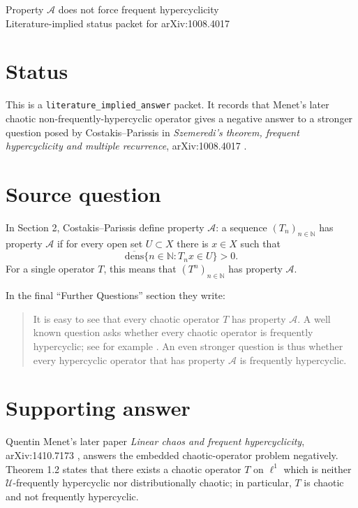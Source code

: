 \documentclass[11pt]{article}
\begin{document}
\begin{center}
{\Large Property \(\mathcal A\) does not force frequent hypercyclicity}\\[4pt]
{\normalsize Literature-implied status packet for arXiv:1008.4017}
\end{center}

\section*{Status}

This is a \texttt{literature\_implied\_answer} packet. It records that
Menet's later chaotic non-frequently-hypercyclic operator gives a negative
answer to a stronger question posed by Costakis--Parissis in
\emph{Szemeredi's theorem, frequent hypercyclicity and multiple recurrence},
arXiv:1008.4017 \cite{CP}.

\section*{Source question}

In Section 2, Costakis--Parissis define property \(\mathcal A\): a sequence
\((T_n)_{n\in\mathbb N}\) has property \(\mathcal A\) if for every open
set \(U\subset X\) there is \(x\in X\) such that
\[
  \overline{\mathrm{dens}}\{n\in\mathbb N:T_nx\in U\}>0.
\]
For a single operator \(T\), this means that \((T^n)_{n\in\mathbb N}\) has
property \(\mathcal A\).

In the final ``Further Questions'' section they write:
\begin{quote}
It is easy to see that every chaotic operator \(T\) has property
\(\mathcal A\). A well known question asks whether every chaotic operator is
frequently hypercyclic; see for example \cite{BM}. An even stronger question
is thus whether every hypercyclic operator that has property \(\mathcal A\)
is frequently hypercyclic.
\end{quote}

\section*{Supporting answer}

Quentin Menet's later paper \emph{Linear chaos and frequent hypercyclicity},
arXiv:1410.7173 \cite{Menet}, answers the embedded chaotic-operator problem
negatively. Theorem 1.2 states that there exists a chaotic operator \(T\) on
\(\ell^1\) which is neither \(\mathcal U\)-frequently hypercyclic nor
distributionally chaotic; in particular, \(T\) is chaotic and not frequently
hypercyclic.
\end{document}
